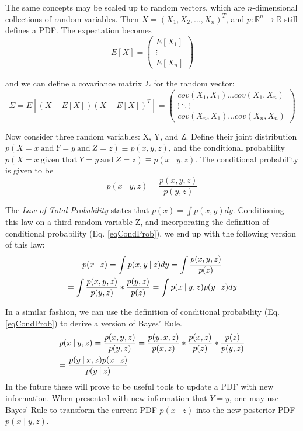 The same concepts may be scaled up to random vectors, which are \(n\)-dimensional collections of random variables. Then \(X = (X_1,X_2,...,X_n)^T\), and \(p:\mathbb{R}^n \to \mathbb{R}\) still defines a PDF. The expectation becomes \[
E[X] = \begin{pmatrix}
E[X_1] \\
\vdots \\
E[X_n]
\end{pmatrix} 
\]

and we can define a covariance matrix \(\Sigma\) for the random vector:
\[
\Sigma = E[(X - E[X])(X - E[X])^T] = \begin{pmatrix}
cov(X_1,X_1)  \dots cov(X_1,X_n) \\
\vdots \ddots \vdots \\
cov(X_n,X_1)  \dots cov(X_n,X_n)
\end{pmatrix} 
\]


Now consider three random variables: X, Y, and Z. Define their joint distribution \(p(X=x\ \textrm{and}\ Y=y\ \textrm{and}\ Z=z) \equiv p(x,y,z)\), and the conditional probability \(p(X=x\ \textrm{given that}\ Y=y\ \textrm{and}\ Z=z) \equiv p(x \mathbin{\vert} y,z)\). The conditional probability is given to be
\begin{equation} \label{eqCondProb}
p(x \mathbin{\vert} y,z) = \frac{p(x,y,z)}{p(y,z)}
\end{equation}

The \textit{Law of Total Probability} states that \(p(x) = \int p(x,y)dy\). Conditioning this law on a third random variable Z, and incorporating the definition of conditional probability (Eq. \ref{eqCondProb}), we end up with the following version of this law:
\begin{multline} \label{eqTotalProb}
p(x \mathbin{\vert} z) = \int p(x,y \mathbin{\vert} z)dy = \int \frac{p(x,y,z)}{p(z)}  \\
= \int \frac{p(x,y,z)}{p(y,z)} * \frac{p(y,z)}{p(z)} = \int p(x \mathbin{\vert} y,z) p(y\mathbin{\vert}z)dy \hfill
\end{multline}

In a similar fashion, we can use the definition of conditional probability (Eq. \ref{eqCondProb}) to derive a version of Bayes' Rule. 
\begin{multline} \label{eqBayesThm}
p(x \mathbin{\vert} y,z) = \frac{p(x,y,z)}{p(y,z)} = \frac{p(y,x,z)}{p(x,z)} * \frac{p(x,z)}{p(z)} * \frac{p(z)}{p(y,z)} \\
= \frac{p(y \mathbin{\vert} x,z)p(x\mathbin{\vert}z)}{p(y \mathbin{\vert} z)} \hfill
\end{multline}
In the future these will prove to be useful tools to update a PDF with new information. When presented with new information that  \(Y = y\), one may use Bayes' Rule to transform the current PDF \(p(x \mathbin{\vert}z)\) into the new posterior PDF \(p(x \mathbin{\vert} y,z)\). %

